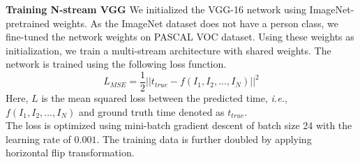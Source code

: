 \textbf{Training N-stream VGG} We initialized the VGG-16 network using ImageNet-pretrained weights. As the ImageNet dataset does not have a person class, we fine-tuned the network weights on PASCAL VOC \cite{pascalVOC} dataset. Using these weights as initialization, we train a multi-stream architecture with shared weights. The network is trained using the following loss function.
$$
L_{MSE} = \frac{1}{2}||t_{true} - f(I_1, I_2, \hdots, I_N)||^{2}
$$
Here, $L$ is the mean squared loss between the predicted time, \emph{i.e.}, $f(I_1, I_2, \hdots, I_N)$ and ground truth time denoted as $t_{true}$. \\
The loss is optimized using mini-batch gradient descent of batch size 24 with the learning rate of $0.001$. The training data is further doubled by applying horizontal flip transformation.
